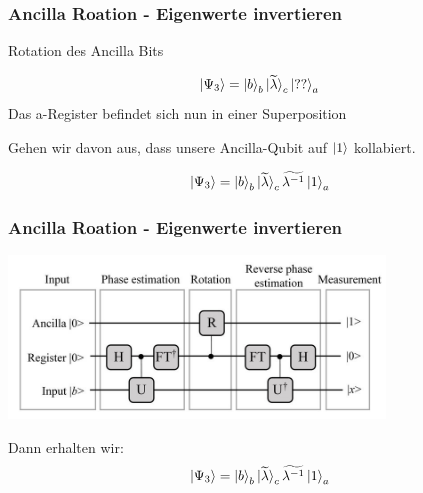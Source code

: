 \begin{frame}
    \frametitle{Ancilla Roation - Eigenwerte invertieren}       
    Rotation des Ancilla Bits

    $$\ket{\Psi_3} = \ket{b}_b \ket{\widetilde{\lambda}}_c\ket{??}_a$$
    Das a-Register befindet sich nun in einer Superposition 

    \hfil

    Gehen wir davon aus, dass unsere Ancilla-Qubit auf $\ket{1}$ kollabiert.

    $$\ket{\Psi_3} = \ket{b}_b \ket{\widetilde{\lambda}}_c \widetilde{\lambda^{-1}} \ket{1}_a$$

\end{frame}


\begin{frame}
    \frametitle{Ancilla Roation - Eigenwerte invertieren}
    \begin{center}
    \includegraphics[width=10cm]{img/hhl_circuit.jpg}
    \end{center}

    Dann erhalten wir:
    $$\ket{\Psi_3} = \ket{b}_b \ket{\widetilde{\lambda}}_c \widetilde{\lambda^{-1}} \ket{1}_a$$


\end{frame}

